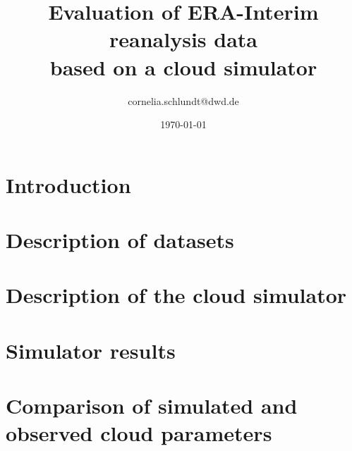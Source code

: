\documentclass[a4paper,11pt]{article}
\begin{document}
\title{Evaluation of ERA-Interim reanalysis data\\ based on a cloud simulator}
\author{cornelia.schlundt@dwd.de}
\date{\today}
\maketitle

\tableofcontents

\newpage
\listoffigures


\newpage
\section{Introduction}\label{sec:intro}
%

\section{Description of datasets}\label{sec:datasets}
%

\newpage
\section{Description of the cloud simulator}\label{simpsimu}
%

\newpage
\section{Simulator results}\label{sec:simulator_results}


\newpage
\section{Comparison of simulated and observed cloud parameters}\label{sec:sim_vs_obs}



\newpage

% 

\end{document}
